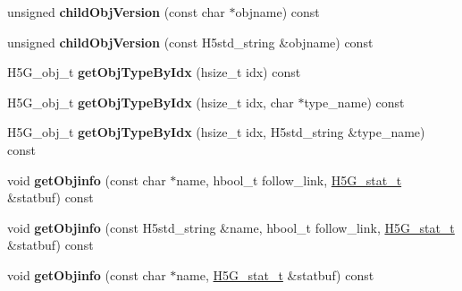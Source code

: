 \begin{DoxyCompactItemize}
\mbox{\label{class_h5_1_1_h5_location_a2c7da824f93a5acaab0b36b66e0cbdba}} 
unsigned {\bfseries child\+Obj\+Version} (const char $\ast$objname) const
\item 
\mbox{\label{class_h5_1_1_h5_location_aa09c5a22b0a7c73b6422294e23faf9c0}} 
unsigned {\bfseries child\+Obj\+Version} (const H5std\+\_\+string \&objname) const
\item 
\mbox{\label{class_h5_1_1_h5_location_aca50c2206092b64b6cd9ca884e62f765}} 
H5\+G\+\_\+obj\+\_\+t {\bfseries get\+Obj\+Type\+By\+Idx} (hsize\+\_\+t idx) const
\item 
\mbox{\label{class_h5_1_1_h5_location_a03a0c4d7a21c368d236abbc76d62cec0}} 
H5\+G\+\_\+obj\+\_\+t {\bfseries get\+Obj\+Type\+By\+Idx} (hsize\+\_\+t idx, char $\ast$type\+\_\+name) const
\item 
\mbox{\label{class_h5_1_1_h5_location_a582e4b776b97837f864d158a68c31164}} 
H5\+G\+\_\+obj\+\_\+t {\bfseries get\+Obj\+Type\+By\+Idx} (hsize\+\_\+t idx, H5std\+\_\+string \&type\+\_\+name) const
\item 
\mbox{\label{class_h5_1_1_h5_location_af58f494751bb96e57f6d1b05429801ce}} 
void {\bfseries get\+Objinfo} (const char $\ast$name, hbool\+\_\+t follow\+\_\+link, \hyperlink{struct_h5_g__stat__t}{H5\+G\+\_\+stat\+\_\+t} \&statbuf) const
\item 
\mbox{\label{class_h5_1_1_h5_location_a019705cd4c7bcdc799687c24782fed27}} 
void {\bfseries get\+Objinfo} (const H5std\+\_\+string \&name, hbool\+\_\+t follow\+\_\+link, \hyperlink{struct_h5_g__stat__t}{H5\+G\+\_\+stat\+\_\+t} \&statbuf) const
\item 
\mbox{\label{class_h5_1_1_h5_location_abf64a4c287b723cc7c9c1e02940a2a6a}} 
void {\bfseries get\+Objinfo} (const char $\ast$name, \hyperlink{struct_h5_g__stat__t}{H5\+G\+\_\+stat\+\_\+t} \&statbuf) const
\item 
\mbox{\label{class_h5_1_1_h5_location_a94d305e5a5fd1ac8a1f9e94264388b2a}} 

\end{DoxyCompactItemize}
